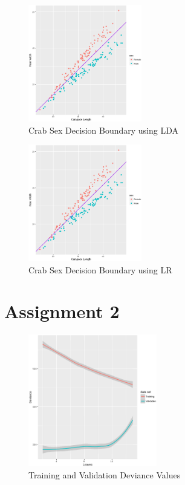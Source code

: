 \documentclass[a4paper, twocolumn]{article}
\begin{document}
        \begin{figure}[h!]
            \centering
            \caption{Crab Sex Decision Boundary using LDA}
            \label{fig:boundarylda}
            \includegraphics[width=0.44\textwidth]{share/boundary.eps}
        \end{figure}

        \begin{figure}[h!]
            \centering
            \caption{Crab Sex Decision Boundary using LR}
            \label{fig:boundarylr}
            \includegraphics[width=0.44\textwidth]{share/boundary.eps}
        \end{figure}

        \newpage

    \section*{Assignment 2}

        \begin{figure}[h!]
            \centering
            \caption{Training and Validation Deviance Values}
            \label{fig:deviance}
            \includegraphics[width=0.5\textwidth]{share/deviance.eps}
        \end{figure}
\end{document}

